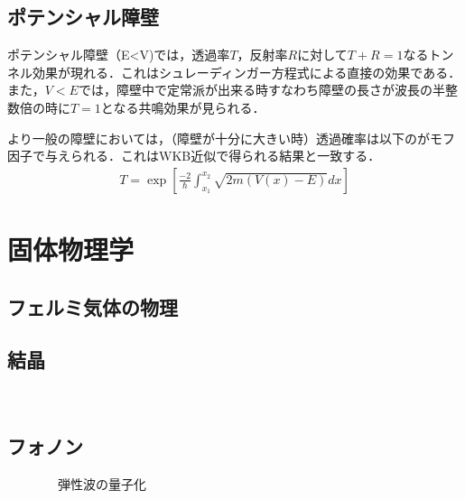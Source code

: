 \documentclass[a4j]{jarticle}
\begin{document}
\subsection{ポテンシャル障壁}
ポテンシャル障壁（E<V)では，透過率$T$，反射率$R$に対して$T+R=1$なるトンネル効果が現れる．これはシュレーディンガー方程式による直接の効果である．
また，$V<E$では，障壁中で定常派が出来る時すなわち障壁の長さが波長の半整数倍の時に$T=1$となる共鳴効果が見られる．

より一般の障壁においては，（障壁が十分に大きい時）透過確率は以下のがモフ因子で与えられる．これはWKB近似で得られる結果と一致する．
\begin{align*}
 T=\exp\left[\frac{-2}{\hbar}\int_{x_1}^{x_2}\sqrt{2m(V(x)-E)}dx\right]
\end{align*}



 \section{固体物理学}
 
  \subsection{フェルミ気体の物理}
  \subsection{結晶}
　\subsection{フォノン}
　　　　弾性波の量子化
\end{document}
